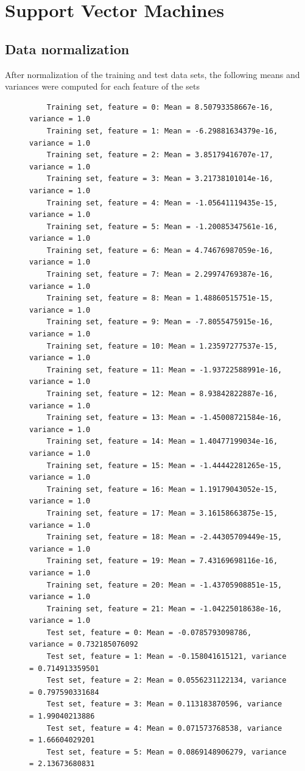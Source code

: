 \documentclass[a4paper]{article}
\begin{document}
\section{Support Vector Machines}
\subsection{Data normalization}
After normalization of the training and test data sets, the following means and variances were computed for each feature of the sets
\begin{figure}[H]
	\begin{lstlisting}
	Training set, feature = 0: Mean = 8.50793358667e-16, variance = 1.0
	Training set, feature = 1: Mean = -6.29881634379e-16, variance = 1.0
	Training set, feature = 2: Mean = 3.85179416707e-17, variance = 1.0
	Training set, feature = 3: Mean = 3.21738101014e-16, variance = 1.0
	Training set, feature = 4: Mean = -1.05641119435e-15, variance = 1.0
	Training set, feature = 5: Mean = -1.20085347561e-16, variance = 1.0
	Training set, feature = 6: Mean = 4.74676987059e-16, variance = 1.0
	Training set, feature = 7: Mean = 2.29974769387e-16, variance = 1.0
	Training set, feature = 8: Mean = 1.48860515751e-15, variance = 1.0
	Training set, feature = 9: Mean = -7.8055475915e-16, variance = 1.0
	Training set, feature = 10: Mean = 1.23597277537e-15, variance = 1.0
	Training set, feature = 11: Mean = -1.93722588991e-16, variance = 1.0
	Training set, feature = 12: Mean = 8.93842822887e-16, variance = 1.0
	Training set, feature = 13: Mean = -1.45008721584e-16, variance = 1.0
	Training set, feature = 14: Mean = 1.40477199034e-16, variance = 1.0
	Training set, feature = 15: Mean = -1.44442281265e-15, variance = 1.0
	Training set, feature = 16: Mean = 1.19179043052e-15, variance = 1.0
	Training set, feature = 17: Mean = 3.16158663875e-15, variance = 1.0
	Training set, feature = 18: Mean = -2.44305709449e-15, variance = 1.0
	Training set, feature = 19: Mean = 7.43169698116e-16, variance = 1.0
	Training set, feature = 20: Mean = -1.43705908851e-15, variance = 1.0
	Training set, feature = 21: Mean = -1.04225018638e-16, variance = 1.0
	Test set, feature = 0: Mean = -0.0785793098786, variance = 0.732185076092
	Test set, feature = 1: Mean = -0.158041615121, variance = 0.714913359501
	Test set, feature = 2: Mean = 0.0556231122134, variance = 0.797590331684
	Test set, feature = 3: Mean = 0.113183870596, variance = 1.99040213886
	Test set, feature = 4: Mean = 0.071573768538, variance = 1.66604029201
	Test set, feature = 5: Mean = 0.0869148906279, variance = 2.13673680831

\end{lstlisting}
\end{figure}
\end{document}
